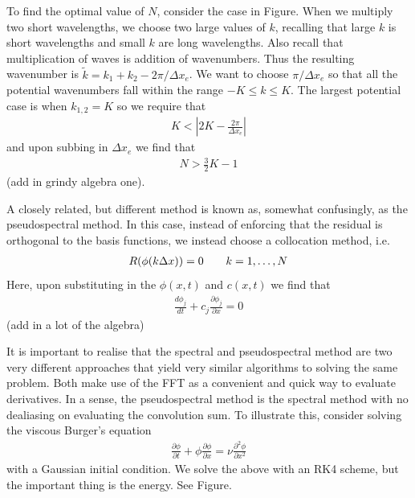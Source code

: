 To find the optimal value of $N$, consider the case in Figure. When we multiply two short wavelengths, we choose two large values of $k$, recalling that large $k$ is short wavelengths and small $k$ are long wavelengths. Also recall that multiplication of waves is addition of wavenumbers. Thus the resulting wavenumber is $\tilde{k}= k_{1}+k_{2}-2\pi/\Delta x_{e}$. We want to choose $\pi/\Delta x_{e}$ so that all the potential wavenumbers fall within the range $-K\le k\le K$. The largest potential case is when $k_{1,2}=K$ so we require that
\begin{align}
K<|2K- \frac{2\pi}{\Delta x_{e}}|
\end{align}
and upon subbing in $\Delta x_{e}$ we find that 
\begin{align}
N > \frac{3}{2}K - 1
\end{align}
(add in grindy algebra one).

A closely related, but different method is known as, somewhat confusingly, as the pseudospectral method.  In this case, instead of enforcing that the residual is orthogonal to the basis functions, we instead choose a collocation method, i.e.
\begin{align}
R(\phi(k\Delta x)) = 0 \qquad k=1,\ldots,N
\end{align}
Here, upon substituting in the $\phi(x,t)$ and $c(x,t)$ we find that
\begin{align}
\frac{d\phi_{j}}{dt} + c_{j}\frac{\partial \phi_{j}}{\partial x} = 0
\end{align}
(add in a lot of the algebra)

It is important to realise that the spectral and pseudospectral method are two very different approaches that yield very similar algorithms to solving the same problem. Both make use of the FFT as a convenient and quick way to evaluate derivatives. In a sense, the pseudospectral method is the spectral method with no dealiasing on evaluating the convolution sum. To illustrate this, consider solving the viscous Burger's equation
\begin{align}
\frac{\partial \phi}{\partial t} + \phi\frac{\partial \phi}{\partial x} = \nu \frac{\partial^{2}\phi}{\partial x^{2}}
\end{align}
with a Gaussian initial condition. We solve the above with an RK4 scheme, but the important thing is the energy. See Figure. 


